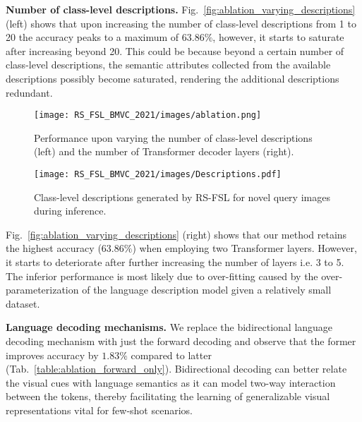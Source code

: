 \documentclass{bmvc2k}
\begin{document}
\noindent \textbf{Number of class-level descriptions.}
Fig.~\ref{fig:ablation_varying_descriptions} (left) shows that upon increasing the number of class-level descriptions from 1 to 20 the accuracy peaks to a maximum of $63.86\%$, however, it starts to saturate after increasing beyond 20. This could be because beyond a certain number of class-level descriptions, the semantic attributes collected from the available descriptions possibly become saturated, rendering the additional descriptions redundant. 



\begin{figure}[!htp]
    \RawFloats
   \begin{minipage}{0.6\textwidth}
     \centering
     \texttt{[image: RS\_FSL\_BMVC\_2021/images/ablation.png]}
     \caption{Performance upon varying the number of class-level descriptions (left) and the number of Transformer decoder layers (right).}\label{fig:ablation_varying_descriptions}
   \end{minipage}\hfill
   \begin{minipage}{0.38\textwidth}
     \centering
     \texttt{[image: RS\_FSL\_BMVC\_2021/images/Descriptions.pdf]}
     \caption{Class-level descriptions generated by RS-FSL for novel query images during inference.}\label{fig:inference_descriptions}
   \end{minipage}
\end{figure}




\noindent Fig.~\ref{fig:ablation_varying_descriptions} (right) shows that our method retains the highest accuracy ($63.86\%$) when employing two Transformer layers. However, it starts to deteriorate after further increasing the number of layers i.e. 3 to 5. The inferior performance is most likely due to over-fitting caused by the over-parameterization of the language description model given a relatively small dataset.

\begin{SCtable}
\centering{}
\caption{Performance using only the forward decoding and the developed bidirectional decoding.}\label{table:ablation_forward_only}
\end{SCtable}
\noindent \textbf{Language decoding mechanisms.} 
We replace the bidirectional language decoding mechanism with just the forward decoding and observe that the former improves accuracy by $1.83\%$ compared to latter (Tab.~\ref{table:ablation_forward_only}). Bidirectional decoding can better relate the visual cues with language semantics as it can model two-way interaction between the tokens, thereby facilitating the learning of generalizable visual representations vital for few-shot scenarios.
\end{document}
